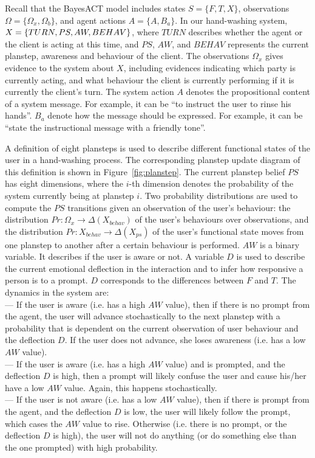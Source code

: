 Recall that the BayesACT model includes states $S = \{F, T, X\}$, observations $\Omega = \{\Omega_{x}, \Omega_{b}\}$, and agent actions $A = \{A, B_{a}\}$. In our hand-washing system, $X = \{TURN, PS, \\ AW, BEHAV\}$, where $TURN$ describes whether the agent or the client is acting at this time, and $PS$, $AW$, and $BEHAV$ represents the current planstep, awareness and behaviour of the client. The observations $\Omega_{x}$ gives evidence to the system about $X$, including evidences indicating which party is currently acting, and what behaviour the client is currently performing if it is currently the client's turn. The system action $A$ denotes the propositional content of a system message. For example, it can be ``to instruct the user to rinse his hands''. $B_{a}$ denote how the message should be expressed. For example, it can be ``state the instructional message with a friendly tone''.

A definition of eight plansteps is used to describe different functional states of the user in a hand-washing process. The corresponding planstep update diagram of this definition is shown in Figure~\ref{fig:planstep}. The current planstep belief $PS$ has eight dimensions, where the $i$-th dimension denotes the probability of the system currently being at planstep $i$. Two probability distributions are used to compute the $PS$ transitions given an observation of the user's behaviour: the distribution $Pr: \Omega_{x} \to \Delta(X_{behav})$ of the user's behaviours over observations, and the distribution $Pr: X_{behav} \to \Delta(X_{ps})$ of the user's functional state moves from one planstep to another after a certain behaviour is performed. $AW$ is a binary variable. It describes if the user is aware or not. A variable $D$ is used to describe the current emotional deflection in the interaction and to infer how responsive a person is to a prompt. $D$ corresponds to the differences between $F$ and $T$. The dynamics in the system are: \\
--- If the user is aware (i.e. has a high $AW$ value), then if there is no prompt from the agent, the user will advance stochastically to the next planstep with a probability that is dependent on the current observation of user behaviour and the deflection $D$. If the user does not advance, she loses awareness (i.e. has a low $AW$ value). \\
--- If the user is aware (i.e. has a high $AW$ value) and is prompted, and the deflection $D$ is high, then a prompt will likely confuse the user and cause his/her have a low $AW$ value. Again, this happens stochastically. \\
--- If the user is not aware (i.e. has a low $AW$ value), then if there is prompt from the agent, and the deflection $D$ is low, the user will likely follow the prompt, which cases the $AW$ value to rise. Otherwise (i.e. there is no prompt, or the deflection $D$ is high), the user will not do anything (or do something else than the one prompted) with high probability.


